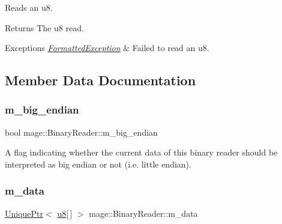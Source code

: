 Reads an {\ttfamily u8}.

\begin{DoxyReturn}{Returns}
The {\ttfamily u8} read. 
\end{DoxyReturn}

\begin{DoxyExceptions}{Exceptions}
{\em \hyperlink{structmage_1_1_formatted_exception}{Formatted\+Exception}} & Failed to read an {\ttfamily u8}. \\
\hline
\end{DoxyExceptions}


\subsection{Member Data Documentation}
\hypertarget{classmage_1_1_binary_reader_a8d23fde958e08efe248edb5d92861113}{}\label{classmage_1_1_binary_reader_a8d23fde958e08efe248edb5d92861113} 
\subsubsection{\texorpdfstring{m\+\_\+big\+\_\+endian}{m\_big\_endian}}
{\footnotesize\ttfamily bool mage\+::\+Binary\+Reader\+::m\+\_\+big\+\_\+endian\hspace{0.3cm}{\ttfamily [private]}}

A flag indicating whether the current data of this binary reader should be interpreted as big endian or not (i.\+e. little endian). \hypertarget{classmage_1_1_binary_reader_afd18df56e004f119e9e082458bf9efc6}{}\label{classmage_1_1_binary_reader_afd18df56e004f119e9e082458bf9efc6} 
\subsubsection{\texorpdfstring{m\+\_\+data}{m\_data}}
{\footnotesize\ttfamily \hyperlink{namespacemage_a3316d7143a973e37adf1110f2e80ca31}{Unique\+Ptr}$<$ \hyperlink{namespacemage_a5a362e2d56fc439362a80516ecae7828}{u8}\mbox{[}$\,$\mbox{]} $>$ mage\+::\+Binary\+Reader\+::m\+\_\+data\hspace{0.3cm}{\ttfamily [private]}}

